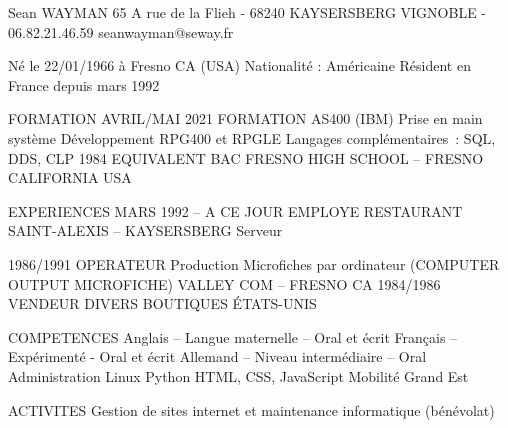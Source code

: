 \documentclass{article}
\begin{document}
Sean WAYMAN
65 A rue de la Flieh       -       68240 KAYSERSBERG VIGNOBLE        -        06.82.21.46.59
seanwayman@seway.fr

Né le 22/01/1966 à Fresno CA (USA)
Nationalité : Américaine
Résident en France depuis mars 1992

FORMATION
AVRIL/MAI 2021
FORMATION AS400 (IBM)
Prise en main système
Développement RPG400 et RPGLE
Langages complémentaires : SQL, DDS, CLP
1984
EQUIVALENT BAC 
FRESNO HIGH SCHOOL – FRESNO CALIFORNIA
USA

EXPERIENCES
MARS 1992 – A CE JOUR
EMPLOYE
RESTAURANT SAINT-ALEXIS – KAYSERSBERG
Serveur

1986/1991
OPERATEUR
Production Microfiches par ordinateur 
(COMPUTER OUTPUT MICROFICHE) 
VALLEY COM – FRESNO CA
1984/1986
VENDEUR 
DIVERS BOUTIQUES
ÉTATS-UNIS







COMPETENCES
Anglais – Langue maternelle – Oral et écrit
Français – Expérimenté - Oral et écrit
Allemand – Niveau intermédiaire – Oral
Administration Linux	
Python
HTML, CSS, JavaScript
Mobilité Grand Est

ACTIVITES
Gestion de sites internet et maintenance informatique (bénévolat)
\end{document}
